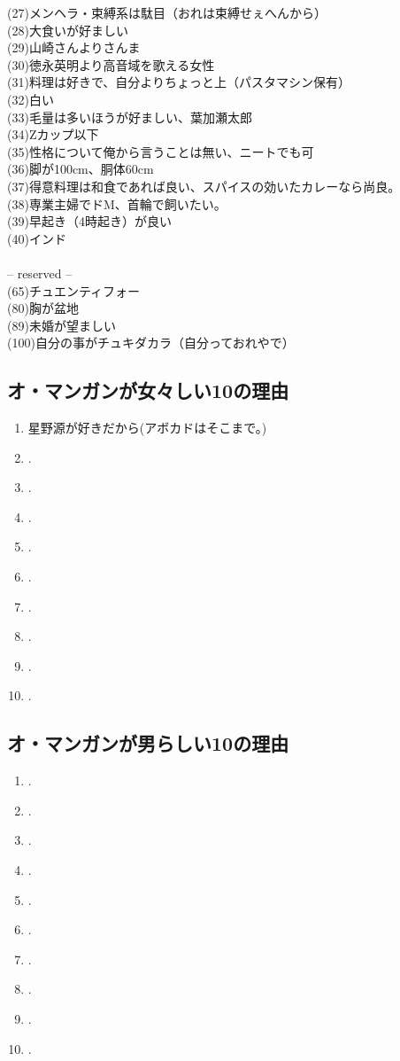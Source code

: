 (27)メンヘラ・束縛系は駄目（おれは束縛せぇへんから）\\
(28)大食いが好ましい\\
(29)山崎さんよりさんま\\
(30)徳永英明より高音域を歌える女性\\
(31)料理は好きで、自分よりちょっと上（パスタマシン保有）\\
(32)白い\\
(33)毛量は多いほうが好ましい、葉加瀬太郎\\
(34)Zカップ以下\\
(35)性格について俺から言うことは無い、ニートでも可\\
(36)脚が100cm、胴体60cm\\
(37)得意料理は和食であれば良い、スパイスの効いたカレーなら尚良。\\
(38)専業主婦でドM、首輪で飼いたい。\\
(39)早起き（4時起き）が良い\\
(40)インド\\
\\
-- reserved --\\ 
(65)チュエンティフォー\\
(80)胸が盆地\\
(89)未婚が望ましい\\
(100)自分の事がチュキダカラ（自分っておれやで）\\

\newpage
\subsection{オ・マンガンが女々しい10の理由}
\begin{enumerate}
\item 星野源が好きだから(アボカドはそこまで。)
\item .
\item .
\item .
\item .
\item .
\item .
\item .
\item .
\item .
\end{enumerate}


\subsection{オ・マンガンが男らしい10の理由}
\begin{enumerate}
\item .
\item .
\item .
\item .
\item .
\item .
\item .
\item .
\item .
\item .
\end{enumerate}

